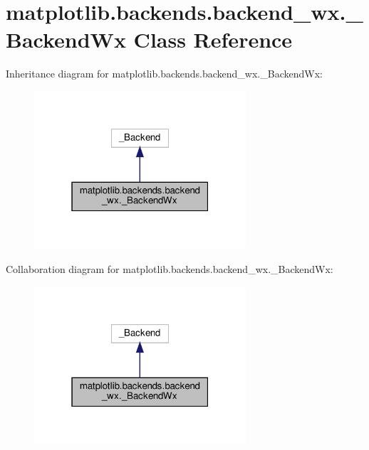 \hypertarget{classmatplotlib_1_1backends_1_1backend__wx_1_1__BackendWx}{}\section{matplotlib.\+backends.\+backend\+\_\+wx.\+\_\+\+Backend\+Wx Class Reference}
\label{classmatplotlib_1_1backends_1_1backend__wx_1_1__BackendWx}


Inheritance diagram for matplotlib.\+backends.\+backend\+\_\+wx.\+\_\+\+Backend\+Wx\+:
\nopagebreak
\begin{figure}[H]
\begin{center}
\leavevmode
\includegraphics[width=223pt]{classmatplotlib_1_1backends_1_1backend__wx_1_1__BackendWx__inherit__graph}
\end{center}
\end{figure}


Collaboration diagram for matplotlib.\+backends.\+backend\+\_\+wx.\+\_\+\+Backend\+Wx\+:
\nopagebreak
\begin{figure}[H]
\begin{center}
\leavevmode
\includegraphics[width=223pt]{classmatplotlib_1_1backends_1_1backend__wx_1_1__BackendWx__coll__graph}
\end{center}
\end{figure}
